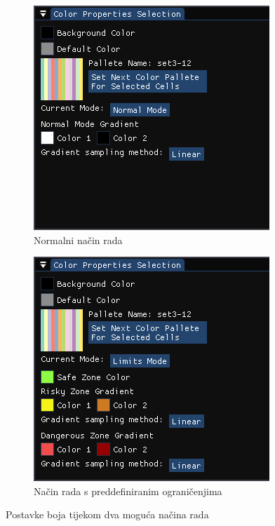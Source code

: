 \documentclass[times, utf8, diplomski]{fer}
\begin{document}
\begin{figure} [H]
     \centering
     \begin{subfigure}[h]{0.49\textwidth}
         \centering
         \includegraphics[width=\textwidth]{color_settings_normal_mode.png}
         \caption{Normalni način rada}
         \label{fig:color-settings-normal-mode}
     \end{subfigure}
     \hfill
     \begin{subfigure}[h]{0.49\textwidth}
         \centering
         \includegraphics[width=\textwidth]{color_settings_limits_mode.png}
         \caption{Način rada s preddefiniranim ograničenjima}
         \label{fig:color-settings-limits-mode}
     \end{subfigure}
     \caption{Postavke boja tijekom dva moguća načina rada\\}
     \label{fig:color-settings-2-modes}
\end{figure}
\end{document}
